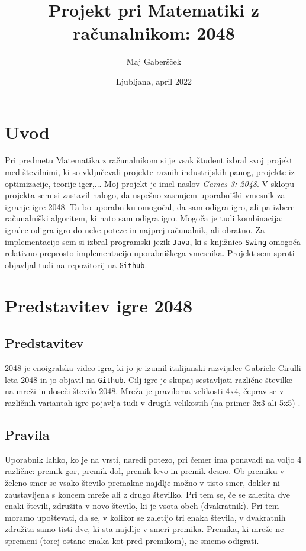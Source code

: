 \documentclass{article}
\title{Projekt pri Matematiki z računalnikom: 2048}
\author{Maj Gaberšček}
\date{Ljubljana, april 2022}
\begin{document}
\maketitle

\section{Uvod}
Pri predmetu Matematika z računalnikom si je vsak študent izbral svoj projekt med številnimi, ki so vključevali projekte raznih industrijskih panog, projekte iz optimizacije, teorije iger,... Moj projekt je imel naslov \emph{Games 3: 2048}. V sklopu projekta sem si zastavil nalogo, da uspešno zasnujem uporabniški vmesnik za igranje igre 2048. Ta bo uporabniku omogočal, da sam odigra igro, ali pa izbere računalniški algoritem, ki nato sam odigra igro. Mogoča je tudi kombinacija: igralec odigra igro do neke poteze in najprej računalnik, ali obratno. Za implementacijo sem si izbral programski jezik \texttt{Java}, ki s knjižnico \texttt{Swing} omogoča relativno preprosto implementacijo uporabniškega vmesnika. Projekt sem sproti objavljal tudi na repozitorij na \texttt{Github}.

\section{Predstavitev igre 2048}

\subsection{Predstavitev}

2048 je enoigralska video igra, ki jo je izumil italijanski razvijalec Gabriele Cirulli leta 2048 in jo objavil na \texttt{Github}. Cilj igre je skupaj sestavljati različne številke na mreži in doseči število 2048. Mreža je praviloma velikosti 4x4, čeprav se v različnih variantah igre pojavlja tudi v drugih velikostih (na primer 3x3 ali 5x5) \cite{wiki:2048_(video_game)}.

\subsection{Pravila}

Uporabnik lahko, ko je na vrsti, naredi potezo, pri čemer ima ponavadi na voljo 4 različne: premik gor, premik dol, premik levo in premik desno. Ob premiku v želeno smer se vsako število premakne najdlje možno v tisto smer, dokler ni zaustavljena s koncem mreže ali z drugo številko. Pri tem se, če se zaletita dve enaki števili, združita v novo število, ki je vsota obeh (dvakratnik). Pri tem moramo upoštevati, da se, v kolikor se zaletijo tri enaka števila, v dvakratnih združita samo tisti dve, ki sta najdlje v smeri premika. Premika, ki mreže ne spremeni (torej ostane enaka kot pred premikom), ne smemo odigrati.
\end{document}
